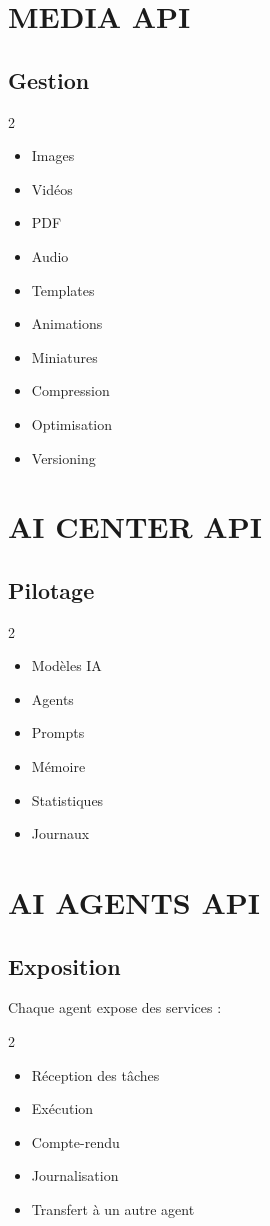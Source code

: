 \documentclass[12pt,a4paper,oneside]{book}
\begin{document}
\chapter{MEDIA API}

\section{Gestion}
\begin{multicols}{2}
\begin{itemize}
\item Images
\item Vidéos
\item PDF
\item Audio
\item Templates
\item Animations
\item Miniatures
\item Compression
\item Optimisation
\item Versioning
\end{itemize}
\end{multicols}

\chapter{AI CENTER API}

\section{Pilotage}
\begin{multicols}{2}
\begin{itemize}
\item Modèles IA
\item Agents
\item Prompts
\item Mémoire
\item Statistiques
\item Journaux
\end{itemize}
\end{multicols}

\chapter{AI AGENTS API}

\section{Exposition}
Chaque agent expose des services :
\begin{multicols}{2}
\begin{itemize}
\item Réception des tâches
\item Exécution
\item Compte-rendu
\item Journalisation
\item Transfert à un autre agent
\end{itemize}
\end{multicols}
\end{document}
